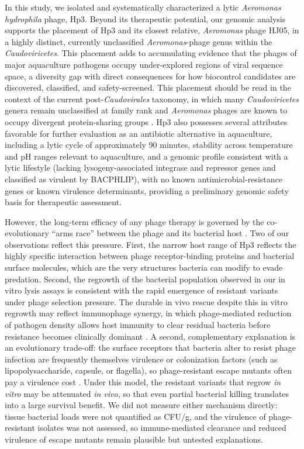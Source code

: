 In this study, we isolated and systematically characterized a lytic
\emph{Aeromonas hydrophila} phage, Hp3. Beyond its therapeutic
potential, our genomic analysis supports the placement of Hp3 and its
closest relative, \emph{Aeromonas} phage HJ05, in a highly distinct,
currently unclassified \emph{Aeromonas}-phage genus within the
\emph{Caudoviricetes}. This placement adds to accumulating evidence that
the phages of major aquaculture pathogens occupy under-explored regions
of viral sequence space, a diversity gap with direct consequences for how
biocontrol candidates are discovered, classified, and safety-screened. This placement should be read in the context of
the current post-\emph{Caudovirales} taxonomy, in which many
\emph{Caudoviricetes} genera remain unclassified at family rank and
\emph{Aeromonas} phages are known to occupy divergent protein-sharing
groups \citep{2023-Abolishment_Turner,2022-Characterization_Bujak}. Hp3
also possesses several attributes favorable for further evaluation as an
antibiotic alternative in aquaculture, including a lytic cycle of
approximately 90 minutes, stability across temperature and pH ranges
relevant to aquaculture, and a genomic profile consistent with a lytic
lifestyle (lacking lysogeny-associated integrase and repressor genes and
classified as virulent by BACPHLIP), with no known
antimicrobial-resistance genes or known virulence
determinants, providing a preliminary genomic safety basis for
therapeutic assessment.

However, the long-term efficacy of any phage therapy is governed by the co-evolutionary ``arms race'' between the phage and its
bacterial host \citep{2023-Developing_Oromi-Bosch}. Two of our
observations reflect this pressure. First, the narrow host range of Hp3
reflects the highly specific interaction between phage receptor-binding
proteins and bacterial surface molecules, which are the very structures
bacteria can modify to evade predation. Second, the regrowth of the
bacterial population observed in our in vitro lysis assays is consistent
with the rapid emergence of resistant variants under phage selection
pressure. The durable in vivo rescue despite this in vitro regrowth may
reflect immunophage synergy, in which phage-mediated reduction of
pathogen density allows host immunity to clear residual bacteria before
resistance becomes clinically dominant \citep{2018-Phage_Torres-Barcelo}.
A second, complementary explanation is an evolutionary trade-off: the
surface receptors that bacteria alter to resist phage infection are
frequently themselves virulence or colonization factors (such as
lipopolysaccharide, capsule, or flagella), so phage-resistant escape
mutants often pay a virulence cost \citep{2015-Virulence_Leon}. Under
this model, the resistant variants that regrow \emph{in vitro} may be
attenuated \emph{in vivo}, so that even partial bacterial killing
translates into a large survival benefit. We did not measure either
mechanism directly: tissue bacterial loads were not quantified as CFU/g,
and the virulence of phage-resistant isolates was not assessed, so
immune-mediated clearance and reduced virulence of escape mutants remain
plausible but untested explanations.

